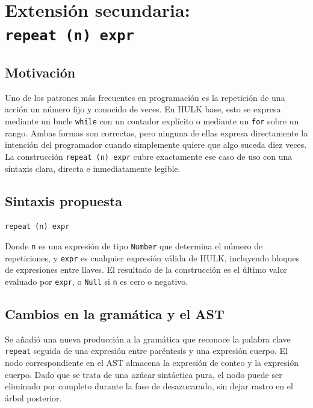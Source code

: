 \documentclass[12pt, a4paper]{article}
\begin{document}
\section{Extensión secundaria: \texttt{repeat~(n)~expr}}

\subsection{Motivación}

Uno de los patrones más frecuentes en programación es la repetición de una acción un número fijo y conocido de veces. En HULK base, esto se expresa mediante un bucle \texttt{while} con un contador explícito o mediante un \texttt{for} sobre un rango. Ambas formas son correctas, pero ninguna de ellas expresa directamente la intención del programador cuando simplemente quiere que algo suceda diez veces. La construcción \texttt{repeat~(n)~expr} cubre exactamente ese caso de uso con una sintaxis clara, directa e inmediatamente legible.

\subsection{Sintaxis propuesta}

\begin{center}
\texttt{repeat (n) expr}
\end{center}

Donde \texttt{n} es una expresión de tipo \texttt{Number} que determina el número de repeticiones, y \texttt{expr} es cualquier expresión válida de HULK, incluyendo bloques de expresiones entre llaves. El resultado de la construcción es el último valor evaluado por \texttt{expr}, o \texttt{Null} si \texttt{n} es cero o negativo.

\subsection{Cambios en la gramática y el AST}

Se añadió una nueva producción a la gramática que reconoce la palabra clave \texttt{repeat} seguida de una expresión entre paréntesis y una expresión cuerpo. El nodo correspondiente en el AST almacena la expresión de conteo y la expresión cuerpo. Dado que se trata de una azúcar sintáctica pura, el nodo puede ser eliminado por completo durante la fase de desazucarado, sin dejar rastro en el árbol posterior.
\end{document}
